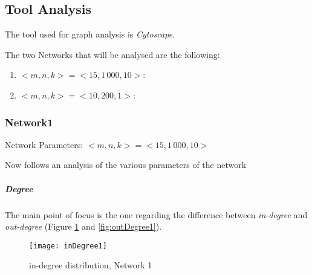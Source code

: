\documentclass[11pt, a4paper]{report}
\begin{document}
\subsection*{Tool Analysis}
\label{sec:toolAnalysis}
	The tool used for graph analysis is \emph{Cytoscape}. 
	\par
	The two Networks that will be analysed are the following: 
	\begin{enumerate}
		\item $<\!m, n, k\!> = <\!15, 1\,000, 10\!>$: 
		\item $<\!m, n, k\!> = <\!10, 200, 1\!>$: 
	\end{enumerate}

\subsubsection*{Network1}
\label{sec:network1}
	Network Parameters: $<\!m, n, k\!> = <\!15, 1\,000, 10\!>$
	\par
	Now follows an analysis of the various parameters of the network
	
\subparagraph*{Degree}
	The main point of focus is the one regarding the difference between \emph{in-degree} and \emph{out-degree} (Figure \ref{fig:inDegree1} and \ref{fig:outDegree1}). 
	\begin{figure}[H]
		\centering
		\texttt{[image: inDegree1]}
		\caption{in-degree distribution, Network 1}
		\label{fig:inDegree1}
	\end{figure}
\end{document}
